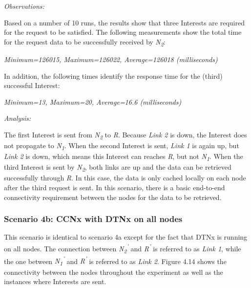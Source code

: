 \documentclass[a4paper,12pt]{report}      %
\begin{document}
\vspace*{1\baselineskip}\noindent\emph{Observations:}

Based on a number of 10 runs, the results show that three Interests are required for the request to be
satisfied. The following measurements show the total time for the request data to be successfully
received by \emph{N\textsubscript{2}}:

\begin{center}\textsl{Minimum=126015, Maximum=126022, Average=126018 (milliseconds)}\end{center}

In addition, the following times identify the response time for the (third) successful Interest:

\begin{center}\textsl{Minimum=13, Maximum=20, Average=16.6 (milliseconds)}\end{center}

\vspace*{1\baselineskip}\noindent\emph{Analysis:}

The first Interest is sent from \emph{N\textsubscript{2}} to \emph{R}. Because \emph{Link 2} is down, the Interest does not propagate
to \emph{N\textsubscript{1}}. When the second Interest is sent, \emph{Link 1} is again up, but \emph{Link 2} is down, which means this Interest can reaches \emph{R}, but not \emph{N\textsubscript{1}}. When the third Interest is sent by \emph{N\textsubscript{2}}, both links are up and the data can be retrieved successfully through \emph{R}. In this case, the data is only cached locally on each node after the third request is sent. In this scenario, there is a basic end-to-end connectivity requirement between the nodes for the data to be retrieved.

\subsubsection{Scenario 4b: CCNx with DTNx on all nodes}

This scenario is identical to scenario 4a except for the fact that DTNx is running on all nodes. The connection between \emph{N\textsubscript{2}\textsuperscript{'}} and \emph{R\textsuperscript{'}} is referred to as \emph{Link 1}, while the one between \emph{N\textsubscript{1}\textsuperscript{'}} and \emph{R\textsuperscript{'}} is referred to as \emph{Link 2}. Figure 4.14 shows the connectivity between the nodes throughout the experiment as well as the instances where Interests are sent.
\end{document}
